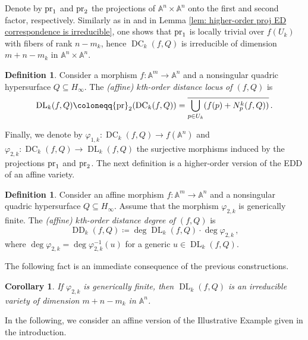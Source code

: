 \documentclass[11pt,reqno]{amsart}
\numberwithin{equation}{section}
\theoremstyle{plain}
\numberwithin{theorem}{section}
\newtheorem{corollary}[theorem]{Corollary}
\theoremstyle{definition}
\newtheorem{definition}[theorem]{Definition}
\newcommand{\A}{\mathbb{A}}
\newcommand{\pr}{{\rm pr}}
\newcommand{\DC}{\operatorname{DC}}
\newcommand{\DL}{\operatorname{DL}}
\newcommand{\DD}{\operatorname{DD}}
\begin{document}
Denote by $\pr_1$ and $\pr_2$ the projections of $\A^n\times\A^n$ onto the first and second factor, respectively. Similarly as in \cite[Theorem 4.1]{DHOST} and in Lemma \ref{lem: higher-order proj ED correspondence is irreducible}, one shows that $\pr_1$ is locally trivial over $f(U_k)$ with fibers of rank $n-m_k$, hence $\DC_k(f,Q)$ is irreducible of dimension $m+n-m_k$ in $\A^n\times\A^n$.

\begin{definition}\label{def: affine kth oder distance locus}
Consider a morphism $f\colon\A^m\to\A^n$ and a nonsingular quadric hypersurface $Q\subseteq H_\infty$.
The {\em (affine) $k$th-order distance locus of $(f,Q)$} is
\[
\DL_k(f,Q) \coloneqq \pr_2(\DC_k(f,Q)) = \overline{\bigcup_{p\in U_k} (f(p) + N_p^k(f,Q))}\,.
\]
\end{definition}

Finally, we denote by $\varphi_{1,k}\colon\DC_k(f,Q)\to f(\A^n)$ and $\varphi_{2,k}\colon\DC_k(f,Q)\to\DL_k(f,Q)$ the surjective morphisms induced by the projections $\pr_1$ and $\pr_2$. The next definition is a higher-order version of the EDD of an affine variety.

\begin{definition}
Consider an affine morphism $f\colon\A^m\to\A^n$ and a nonsingular quadric hypersurface $Q\subseteq H_\infty$. Assume that the morphism $\varphi_{2,k}$ is generically finite. The {\em (affine) $k$th-order distance degree of $(f,Q)$} is
\[
\DD_k(f,Q)\coloneqq\deg\DL_k(f,Q)\cdot\deg\varphi_{2,k}\,,
\]
where $\deg\varphi_{2,k}=\deg\varphi_{2,k}^{-1}(u)$ for a generic $u\in\DL_k(f,Q)$.    
\end{definition}

The following fact is an immediate consequence of the previous constructions.

\begin{corollary}\label{corollary: generically finite}
If $\varphi_{2,k}$ is generically finite, then $\DL_k(f,Q)$ is an irreducible variety of dimension $m+n-m_k$ in $\A^n$.
\end{corollary}

In the following, we consider an affine version of the Illustrative Example given in the introduction.
\end{document}
